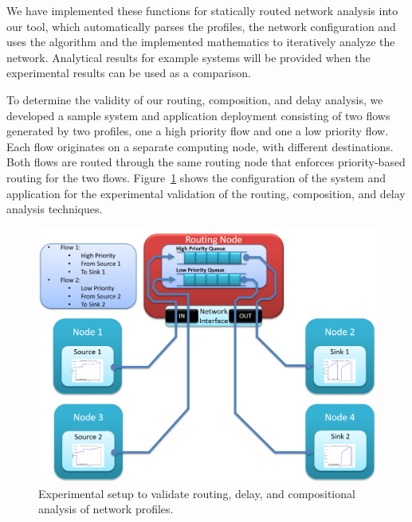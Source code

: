 We have implemented these functions for statically routed network
analysis into our tool, which automatically parses the profiles, the
network configuration and uses the algorithm and the implemented
mathematics to iteratively analyze the network.  Analytical results
for example systems will be provided when the experimental results can
be used as a comparison.

To determine the validity of our routing, composition, and delay
analysis, we developed a sample system and application deployment
consisting of two flows generated by two profiles, one a high priority
flow and one a low priority flow.  Each flow originates on a separate
computing node, with different destinations.  Both flows are routed
through the same routing node that enforces priority-based routing for
the two flows.  Figure~\ref{fig:routing_example} shows the
configuration of the system and application for the experimental
validation of the routing, composition, and delay analysis techniques.

\begin{figure}[ht!]
  \centering
  \includegraphics[width=\textwidth]{./figs/routing_example.png}
  \caption{Experimental setup to validate routing, delay, and
    compositional analysis of network profiles.}
  \label{fig:routing_example}
\end{figure}

